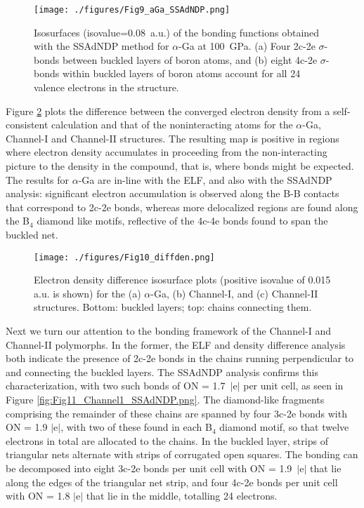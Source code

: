 \documentclass[reprint,aps,prl,twocolumn,letterpaper]{revtex4-2}
\newlength{\figurewidth}
\begin{document}
\begin{figure}
\begin{center}
\texttt{[image: ./figures/Fig9\_aGa\_SSAdNDP.png]}
\end{center}
\caption{Isosurfaces (isovalue=0.08~a.u.) of the bonding functions obtained with the SSAdNDP method for $\alpha$-Ga at 100~GPa. (a) Four 2c-2e $\sigma$-bonds between buckled layers of boron atoms, and (b) eight 4c-2e $\sigma$-bonds within buckled layers of boron atoms account for all 24 valence electrons in the structure. 
\label{fig:Fig9_aGa_SSAdNDP.png}}
\end{figure}

Figure \ref{fig:Fig10_diffden.png} plots the difference between the converged electron density from a self-consistent calculation and that of the noninteracting atoms for the $\alpha$-Ga, Channel-I and Channel-II structures. The resulting map is positive in regions where electron density accumulates in proceeding from the non-interacting picture to the density in the compound, that is, where bonds might be expected. The results for $\alpha$-Ga are in-line with the ELF, and also with the SSAdNDP analysis: significant electron accumulation is observed along the B-B contacts that correspond to 2c-2e bonds, whereas more delocalized regions are found along the B$_4$ diamond like motifs, reflective of the 4c-4e bonds found to span the buckled net.

\begin{figure}
\begin{center}
\texttt{[image: ./figures/Fig10\_diffden.png]}
\end{center}
\caption{Electron density difference isosurface plots (positive isovalue of 0.015 a.u. is shown) for the (a) $\alpha$-Ga, (b) Channel-I, and (c) Channel-II structures. Bottom: buckled layers; top: chains connecting them.
\label{fig:Fig10_diffden.png}}
\end{figure}



Next we turn our attention to the bonding framework of the Channel-I and Channel-II polymorphs. In the former, the ELF and density difference analysis both indicate the presence of 2c-2e bonds in the chains running perpendicular to and connecting the buckled layers. The SSAdNDP analysis confirms this characterization, with two such bonds of ON = 1.7~$\vert$e$\vert$ per unit cell, as seen in Figure \ref{fig:Fig11_Channel1_SSAdNDP.png}. The diamond-like fragments comprising the remainder of these chains are spanned by four 3c-2e bonds with ON = 1.9 $\vert$e$\vert$, with two of these found in each B$_4$ diamond motif, so that twelve electrons in total are allocated to the chains. In the buckled layer, strips of triangular nets alternate with strips of corrugated open squares. The bonding can be decomposed into eight 3c-2e bonds per unit cell with ON = 1.9~$\vert$e$\vert$ that lie along the edges of the triangular net strip, and four 4c-2e bonds per unit cell with ON = 1.8 $\vert$e$\vert$ that lie in the middle, totalling 24 electrons. 
\end{document}
